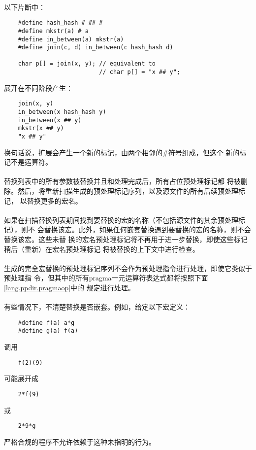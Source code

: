{\paragraph{}
\ex* 以下片断中：
\begin{lstlisting}
    #define hash_hash # ## #
    #define mkstr(a) # a
    #define in_between(a) mkstr(a)
    #define join(c, d) in_between(c hash_hash d)

    char p[] = join(x, y); // equivalent to
                           // char p[] = "x ## y";
\end{lstlisting}
展开在不同阶段产生：
\begin{lstlisting}
    join(x, y)
    in_between(x hash_hash y)
    in_between(x ## y)
    mkstr(x ## y)
    "x ## y"
\end{lstlisting}
换句话说，扩展会产生一个新的标记，由两个相邻的\#符号组成，但这个
新的标记不是运算符。

\paragraph{}
替换列表中的所有参数被替换并且\tm{\#}和\tm{\#\#}处理完成后，所有占位预处理标记都
将被删除。然后，将重新扫描生成的预处理标记序列，以及源文件的所有后续预处理标记，
以替换更多的宏名。

\paragraph{}
如果在扫描替换列表期间找到要替换的宏的名称（不包括源文件的其余预处理标记），则不
会替换该宏。此外，如果任何嵌套替换遇到要替换的宏的名称，则不会替换该宏。这些未替
换的宏名预处理标记将不再用于进一步替换，即使这些标记稍后（重新）在宏名预处理标记
将被替换的上下文中进行检查。

\paragraph{}
生成的完全宏替换的预处理标记序列不会作为预处理指令进行处理，即使它类似于预处理指
令，但其中的所有pragma一元运算符表达式都将按照下面\ref{lang.ppdir.pragmaop}中的
规定进行处理。

\paragraph{}
\ex* 有些情况下，不清楚替换是否嵌套。例如，给定以下宏定义：
\begin{lstlisting}
    #define f(a) a*g
    #define g(a) f(a)
\end{lstlisting}
调用
\begin{lstlisting}
    f(2)(9)
\end{lstlisting}
可能展开成
\begin{lstlisting}
    2*f(9)
\end{lstlisting}
或
\begin{lstlisting}
    2*9*g
\end{lstlisting}
严格合规的程序不允许依赖于这种未指明的行为。

}
